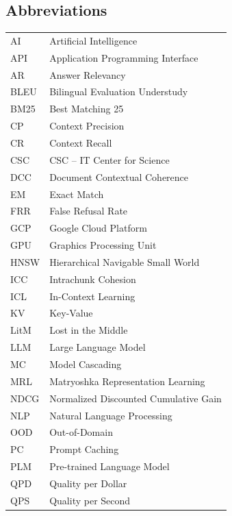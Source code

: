
\subsection*{Abbreviations}

\begin{tabular}{ll}
AI          & Artificial Intelligence \\
API         & Application Programming Interface \\
AR          & Answer Relevancy \\
BLEU        & Bilingual Evaluation Understudy \\
BM25        & Best Matching 25 \\
CP          & Context Precision \\
CR          & Context Recall \\
CSC         & CSC -- IT Center for Science \\
DCC         & Document Contextual Coherence \\
EM          & Exact Match \\
FRR         & False Refusal Rate \\
GCP         & Google Cloud Platform \\
GPU         & Graphics Processing Unit \\
HNSW        & Hierarchical Navigable Small World \\
ICC         & Intrachunk Cohesion \\
ICL         & In-Context Learning \\
KV          & Key-Value \\
LitM        & Lost in the Middle \\
LLM         & Large Language Model \\
MC          & Model Cascading \\
MRL         & Matryoshka Representation Learning \\
NDCG        & Normalized Discounted Cumulative Gain \\
NLP         & Natural Language Processing \\
OOD         & Out-of-Domain \\
PC          & Prompt Caching \\
PLM         & Pre-trained Language Model \\
QPD         & Quality per Dollar \\
QPS         & Quality per Second \\

\end{tabular}
